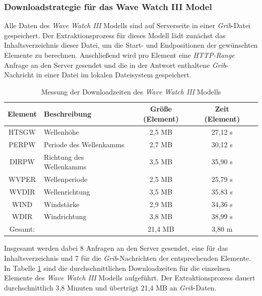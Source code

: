 \subsubsection{Downloadstrategie für das Wave Watch III Model}
Alle Daten des \textit{Wave Watch III} Modells sind auf Serverseite in
einer \textit{Grib}-Datei gespeichert. Der Extraktionsprozess für
dieses Modell lädt zunächst das Inhaltsverzeichnis dieser Datei, um
die Start- und Endpositionen der gewünschten Elemente zu
berechnen. Anschließend wird pro Element eine \textit{HTTP-Range}
Anfrage an den Server gesendet und die in der Antwort enthaltene
\textit{Grib}-Nachricht in einer Datei im lokalen Dateisystem
gespeichert.

\begin{table}[h]
  \centering
  {\sf
    \footnotesize
    \begin{longtable}{@{}clccc}
      \toprule
      \textbf{Element} & \textbf{Beschreibung} & \textbf{Größe (Element)} & \textbf{Zeit (Element)}  \\
      \midrule
      HTSGW & Wellenhöhe & 2,5 MB & 27,12 s \\
      PERPW & Periode des Wellenkamms & 2,7 MB & 30,12 s \\
      DIRPW & Richtung des Wellenkamms & 3,5 MB & 35,90 s \\
      WVPER & Wellenperiode & 2,5 MB & 25,79 s \\
      WVDIR & Wellenrichtung & 3,5 MB & 35,83 s \\
      WIND  & Windstärke & 2,9 MB & 34,36 s \\
      WDIR  & Windrichtung & 3,8 MB & 38,99 s \\
      \midrule
      Gesamt: & & 21,4 MB & 3,80 m \\
      \bottomrule
    \end{longtable}
  }
  \caption{Messung der Downloadzeiten des \textit{Wave Watch III} Modells}
  \label{tab:download_messung_ww3}
\end{table}

Insgesamt werden dabei 8 Anfragen an den Server gesendet, eine für das
Inhaltsverzeichnis und 7 für die \textit{Grib}-Nachrichten der
entsprechenden Elemente. In Tabelle \ref{tab:download_messung_ww3}
sind die durchschnittlichen Downloadzeiten für die einzelnen Elemente
des \textit{Wave Watch III} Modells aufgeführt. Der Extraktionsprozess
dauert durchschnittlich 3,8 Minuten und überträgt 21,4 MB an
\textit{Grib}-Daten.

